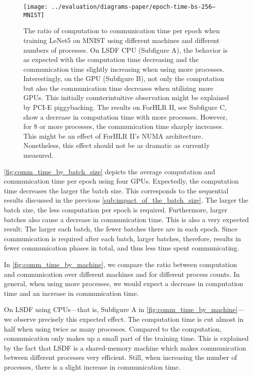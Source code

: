 \documentclass[conference,compsoc,a4paper]{IEEEtran}
\begin{document}
\begin{figure*}[!t]
  \normalsize
  \centering
  \texttt{[image: ../evaluation/diagrams-paper/epoch-time-bs-256--MNIST]}
  \caption{The ratio of computation to communication time per epoch when training LeNet5 on MNIST using different machines and different numbers of processes.
  On LSDF CPU (Subfigure A), the behavior is as expected with the computation time decreasing and the communication time slightly increasing when using more processes.
  Interestingly, on the GPU (Subfigure B), not only the computation but also the communication time decreases when utilizing more GPUs.
  This initially counterintuitive observation might be explained by PCI-E piggybacking.
  The results on ForHLR II, see Subfigure C, show a decrease in computation time with more processes.
  However, for 8 or more processes, the communication time sharply increases.
  This might be an effect of ForHLR II's NUMA architecture.
  Nonetheless, this effect should not be as dramatic as currently measured.
  }
  \label{fig:comm_time_by_machine}
  \vspace*{4pt}
  \hrulefill
\end{figure*}

\autoref{fig:comm_time_by_batch_size} depicts the average computation and communication time per epoch using four GPUs.
Expectedly, the computation time decreases the larger the batch size.
This corresponds to the sequential results discussed in the previous \autoref{sub:impact_of_the_batch_size}.
The larger the batch size, the less computation per epoch is required.
%
Furthermore, larger batches also cause a decrease in communication time.
This is also a very expected result:
The larger each batch, the fewer batches there are in each epoch.
Since communication is required after each batch, larger batches, therefore, results in fewer communication phases in total, and thus less time spent communicating.


In \autoref{fig:comm_time_by_machine}, we compare the ratio between computation and communication over different machines and for different process counts.
In general, when using more processes, we would expect a decrease in computation time and an increase in communication time.

On LSDF using CPUs---that is, Subfigure A in \autoref{fig:comm_time_by_machine}---we observe precisely this expected effect.
The computation time is cut almost in half when using twice as many processes.
Compared to the computation, communication only makes up a small part of the training time.
This is explained by the fact that LSDF is a shared-memory machine which makes communication between different processes very efficient.
Still, when increasing the number of processes, there is a slight increase in communication time.
\end{document}
